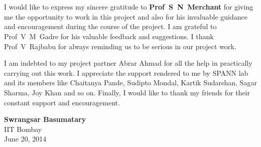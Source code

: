 \chapter*{}


I would like to express my sincere gratitude to \textbf{Prof~S~N~Merchant}
for giving me the opportunity to work in this project and also for his
invaluable guidance and encouragement during the course of the project. I am
grateful to Prof~V~M~Gadre for his valuable feedback and suggestions. I thank
Prof~V~Rajbabu for always reminding us to be serious in our project work.

I am indebted to my project partner Abrar Ahmad 
for all the help in practically carrying out this work. I appreciate the 
support rendered to me by SPANN lab and its members like Chaitanya Pande, 
Sudipto Mondal, Kartik Sudarshan, Sagar Sharma, Joy Khan and so on. Finally,
I would like to thank my friends for their constant support and
encouragement.

\vspace{2.5cm}

\begin{flushright}
\textbf{Swrangsar Basumatary} \\
IIT Bombay \\
June 20, 2014
\end{flushright}
